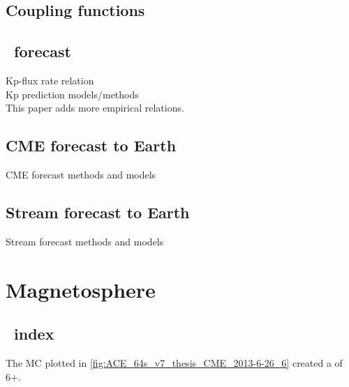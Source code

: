 \subsection{Coupling functions}
\label{sec:coupling_functions}

\subsection{\Kp~forecast}
\label{sec:kp_forecast}
Kp-flux rate relation\\
Kp prediction models/methods\\
This paper adds more empirical relations.\\

\subsection{CME forecast to Earth}
CME forecast methods and models\\

\subsection{Stream forecast to Earth}
Stream forecast methods and models\\



% 
%
%



\section{Magnetosphere}
\subsection{\Kp~index}

The MC plotted in \autoref{fig:ACE_64s_v7_thesis_CME_2013-6-26_6} created a \Kp{} of 6+.\\


